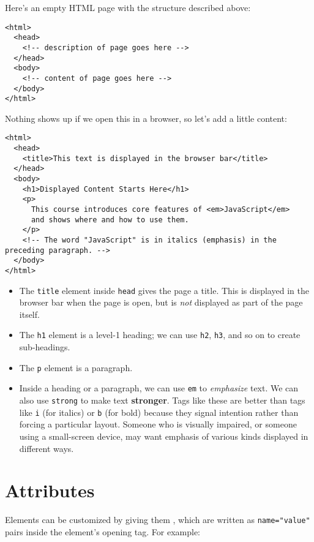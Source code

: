 Here's an empty HTML page with the structure described above:

\begin{verbatim}
<html>
  <head>
    <!-- description of page goes here -->
  </head>
  <body>
    <!-- content of page goes here -->
  </body>
</html>
\end{verbatim}

\noindent
Nothing shows up if we open this in a browser,
so let's add a little content:

\begin{verbatim}
<html>
  <head>
    <title>This text is displayed in the browser bar</title>
  </head>
  <body>
    <h1>Displayed Content Starts Here</h1>
    <p>
      This course introduces core features of <em>JavaScript</em>
      and shows where and how to use them.
    </p>
    <!-- The word "JavaScript" is in italics (emphasis) in the preceding paragraph. -->
  </body>
</html>
\end{verbatim}


\begin{itemize}
\item
  The \texttt{title} element inside \texttt{head} gives the page a title.
  This is displayed in the browser bar when the page is open,
  but is \emph{not} displayed as part of the page itself.
\item
  The \texttt{h1} element is a level-1 heading;
  we can use \texttt{h2}, \texttt{h3}, and so on to create sub-headings.
\item
  The \texttt{p} element is a paragraph.
\item
  Inside a heading or a paragraph,
  we can use \texttt{em} to \emph{emphasize} text.
  We can also use \texttt{strong} to make text \textbf{stronger}.
  Tags like these are better than tags like \texttt{i} (for italics) or \texttt{b} (for bold)
  because they signal intention rather than forcing a particular layout.
  Someone who is visually impaired, or someone using a small-screen device,
  may want emphasis of various kinds displayed in different ways.
\end{itemize}

\section{Attributes}\label{s:htmlcss-attributes}

Elements can be customized by giving them ,
which are written as \texttt{name="value"} pairs inside the element's opening tag.
For example:

